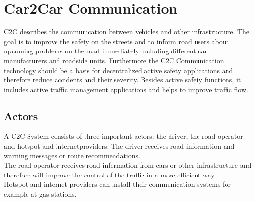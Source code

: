 \chapter{Car2Car Communication}
\label{cha:Car2Car}
C2C describes the communication between vehicles and other infrastructure. The goal is to improve the safety on the streets and to inform road users about upcoming problems on the road immediately including different car manufacturers and roadside units. Furthermore the C2C Communication technology should be a basis for decentralized active safety applications and therefore reduce accidents and their severity. Besides active safety functions, it includes active traffic management applications and helps to improve traffic flow.

\section{Actors}
\label{sec:Actors}
A C2C System consists of three important actors: the driver, the road operator and hotspot and internetproviders.
The driver receives road information and warning messages or route recommendations.\\
The road operator receives road information from cars or other infrastructure and therefore will improve the control of the traffic in a more efficient way.\\
Hotspot and internet providers can install their communication systems for example at gas stations.\cite{c2cmanifesto}

